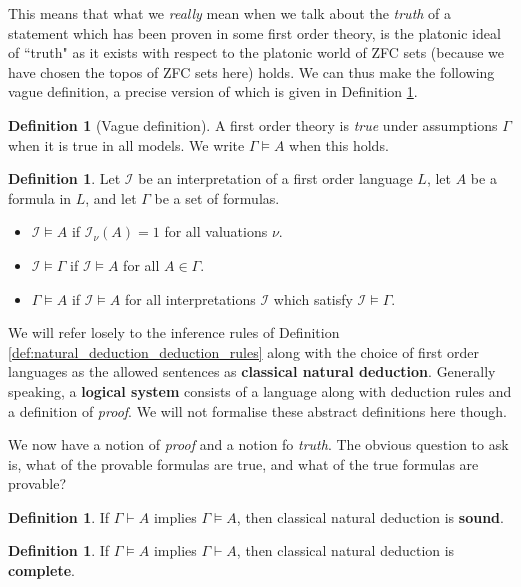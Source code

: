 \documentclass[12pt]{article}
\theoremstyle{plain}
\theoremstyle{definition}
\newtheorem{defn}[thm]{Definition} %
\newcommand{\call}[1]{\mathcal{#1}}
\begin{document}
	This means that what we \emph{really} mean when we talk about the \emph{truth} of a statement which has been proven in some first order theory, is the platonic ideal of ``truth" as it exists with respect to the platonic world of ZFC sets (because we have chosen the topos of ZFC sets here) holds. We can thus make the following vague definition, a precise version of which is given in Definition \ref{def:models}.
	
	\begin{defn}[Vague definition] A first order theory is \emph{true} under assumptions $\Gamma$ when it is true in all models. We write $\Gamma \models A$ when this holds.
		\end{defn}
	
	\begin{defn}\label{def:models}
		Let $\call{I}$ be an interpretation of a first order language $L$, let $A$ be a formula in $L$, and let $\Gamma$ be a set of formulas.
		\begin{itemize}
			\item $\call{I} \models A$ if $\call{I}_\nu(A) = 1$ for all valuations $\nu$.
			\item $\call{I} \models \Gamma$ if $\call{I} \models A$ for all $A \in \Gamma$.
			\item $\Gamma \models A$ if $\call{I} \models A$ for all interpretations $\call{I}$ which satisfy $\call{I} \models \Gamma$.
			\end{itemize}
		\end{defn}
	
	We will refer losely to the inference rules of Definition \ref{def:natural_deduction_deduction_rules} along with the choice of first order languages as the allowed sentences as \textbf{classical natural deduction}. Generally speaking, a \textbf{logical system} consists of a language along with deduction rules and a definition of \emph{proof}. We will not formalise these abstract definitions here though.
	
	We now have a notion of \emph{proof} and a notion fo \emph{truth}. The obvious question to ask is, what of the provable formulas are true, and what of the true formulas are provable?
	
	\begin{defn}
		If $\Gamma \vdash A$ implies $\Gamma \models A$, then classical natural deduction is \textbf{sound}.
		\end{defn}
	
	\begin{defn}
		If $\Gamma \models A$ implies $\Gamma \vdash A$, then classical natural deduction is \textbf{complete}.
		\end{defn}
	
\end{document}
